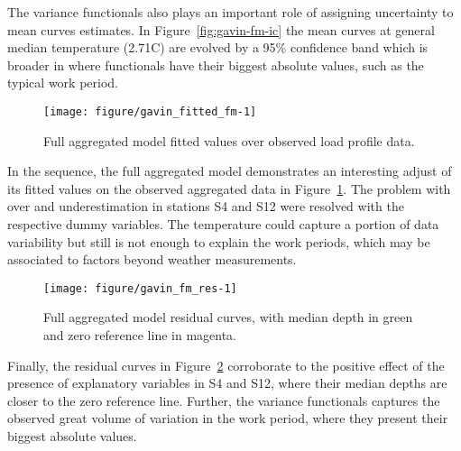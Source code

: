 The variance functionals also plays an important role of assigning uncertainty to mean curves estimates. In Figure~\ref{fig:gavin-fm-ic} the mean curves at general median temperature (2.71\textdegree C) are evolved by a 95\% confidence band which is broader in where functionals have their biggest absolute values, such as the typical work period.


\begin{figure}[t]\centering
\begin{knitrout}
\color{fgcolor}
\texttt{[image: figure/gavin\_fitted\_fm-1]} 

\end{knitrout}
\caption{Full aggregated model fitted values over observed load profile data.}
\label{fig:gavin-fitted2}
\end{figure}


In the sequence, the full aggregated model demonstrates an interesting adjust of its fitted values on the observed aggregated data in Figure~\ref{fig:gavin-fitted2}. The problem with over and underestimation in stations S4 and S12 were resolved with the respective dummy variables. The temperature could capture a portion of data variability but  still is not enough to explain the work periods, which may be associated to factors beyond weather measurements. 

\begin{figure}[t]
  \centering
\begin{knitrout}
\color{fgcolor}
\texttt{[image: figure/gavin\_fm\_res-1]} 

\end{knitrout}
  \caption{Full aggregated model residual curves, with median depth in green and zero reference line in magenta.}
  \label{fig:gavin-res2}
\end{figure}


Finally, the residual curves in Figure~\ref{fig:gavin-res2} corroborate to the positive effect of the presence of explanatory variables in S4 and S12, where their median depths are closer to the zero reference line. Further, the variance functionals captures the observed great volume of variation in the work period, where they present their biggest absolute values. 

